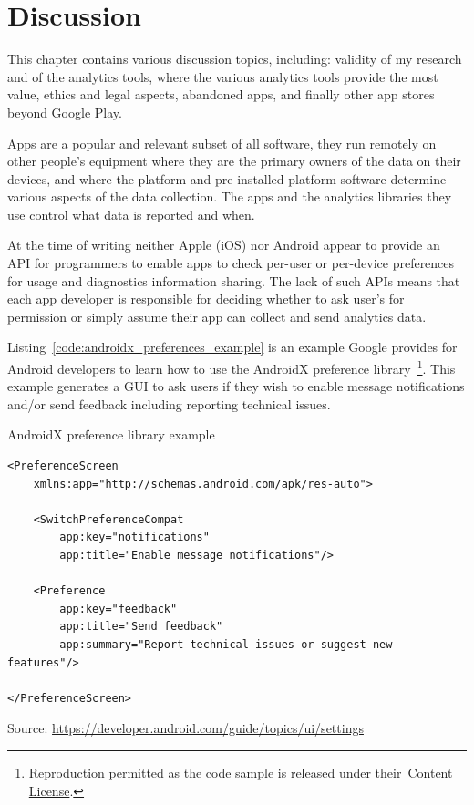 \chapter{Discussion}
\label{chapter-discussion}



This chapter contains various discussion topics, including: validity of my research and of the analytics tools, where the various analytics tools provide the most value, ethics and legal aspects, abandoned apps, and finally other app stores beyond Google Play.


Apps are a popular and relevant subset of all software, they run remotely on other people’s equipment where they are the primary owners of the data on their devices, and where the platform and pre-installed platform software determine various aspects of the data collection. The apps and the analytics libraries they use control what data is reported and when. 

At the time of writing neither Apple (iOS) nor Android appear to provide an API for programmers to enable apps to check per-user or per-device preferences for usage and diagnostics information sharing. The lack of such APIs means that each app developer is responsible for deciding whether to ask user's for permission or simply assume their app can collect and send analytics data. 

Listing~\ref{code:androidx_preferences_example} is an example Google provides for Android developers to learn how to use the AndroidX preference library~\footnote{Reproduction permitted as the code sample is released under their~\href{https://developer.android.com/license}{Content License}.}. This example generates a GUI to ask users if they wish to enable message notifications and/or send feedback including reporting technical issues. 

\begin{listing}[H]
\caption{AndroidX preference library example} \label{code:androidx_preferences_example}
\begin{verbatim}
<PreferenceScreen
    xmlns:app="http://schemas.android.com/apk/res-auto">

    <SwitchPreferenceCompat
        app:key="notifications"
        app:title="Enable message notifications"/>

    <Preference
        app:key="feedback"
        app:title="Send feedback"
        app:summary="Report technical issues or suggest new features"/>

</PreferenceScreen>
\end{verbatim}
Source: \url{https://developer.android.com/guide/topics/ui/settings}
\end{listing}


